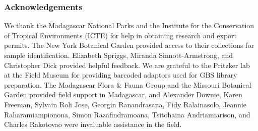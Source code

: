 \documentclass[10pt,letterpaper]{article}
\begin{document}

\subsubsection*{Acknowledgements}
We thank the Madagascar National Parks and the Institute for the Conservation of Tropical Environments (ICTE) for help in obtaining research and export permits. The New York Botanical Garden provided access to their collections for sample identification. Elizabeth Spriggs, Miranda Sinnott-Armstrong, and Christopher Dick provided helpful feedback. We are grateful to the Pritzker lab at the Field Museum for providing barcoded adaptors used for GBS library preparation. The Madagascar Flora \& Fauna Group and the Missouri Botanical Garden provided field support in Madagascar, and Alexander Downie, Karen Freeman, Sylvain Roli Jose, Georgin Ranandrasana, Fidy Ralainasolo, Jeannie Raharamiampionona, Simon Razafindramoana, Tsitohaina Andriamiarison, and Charles Rakotovao were invaluable assistance in the field.


\end{document}
